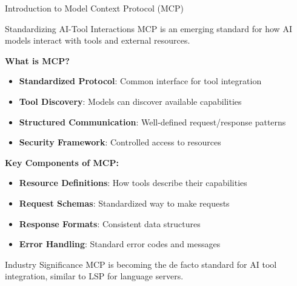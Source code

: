 \documentclass{beamer}
\begin{document}
\begin{frame}[t]{Introduction to Model Context Protocol (MCP)}
    \begin{block}{Standardizing AI-Tool Interactions}
        MCP is an emerging standard for how AI models interact with tools and external resources.
    \end{block}
    
    \textbf{What is MCP?}
    \begin{itemize}
        \item \textbf{Standardized Protocol}: Common interface for tool integration
        \item \textbf{Tool Discovery}: Models can discover available capabilities
        \item \textbf{Structured Communication}: Well-defined request/response patterns
        \item \textbf{Security Framework}: Controlled access to resources
    \end{itemize}
    
    \textbf{Key Components of MCP:}
    \begin{itemize}
        \item \textbf{Resource Definitions}: How tools describe their capabilities
        \item \textbf{Request Schemas}: Standardized way to make requests
        \item \textbf{Response Formats}: Consistent data structures
        \item \textbf{Error Handling}: Standard error codes and messages
    \end{itemize}
    
    \begin{alertblock}{Industry Significance}
        MCP is becoming the de facto standard for AI tool integration, similar to LSP for language servers.
    \end{alertblock}
\end{frame}
\end{document}
